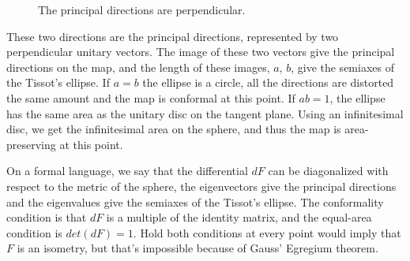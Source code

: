 \documentclass[a4paper,12pt]{article}
\begin{document}
\begin{figure}[ht]
 \begin{center}
  \def\svgwidth{ 0.85 \textwidth}

\caption{The principal directions are perpendicular.}
 \end{center}
\end{figure}


These two directions are the principal directions, represented by two perpendicular unitary vectors. The image of these two vectors give the principal directions on the map, and the length of these images, $a$, $b$, give the semiaxes of the Tissot's ellipse. If $a=b$ the ellipse is a circle, all the directions are distorted the same amount and the map is conformal at this point. If $ab=1$, the ellipse has the same area as the unitary disc on the tangent plane. Using an infinitesimal disc, we get the infinitesimal area on the sphere, and thus the map is area-preserving at this point.

On a formal language, we say that the differential $dF$ can be diagonalized with respect to the metric of the sphere, the eigenvectors give the principal directions and the eigenvalues give the semiaxes of the Tissot's ellipse. The conformality condition is that $dF$ is a multiple of the identity matrix, and the equal-area condition is $det(dF)=1$. Hold both conditions at every point would imply that $F$ is an isometry, but that's impossible because of Gauss' Egregium theorem.

 
 
\end{document}
